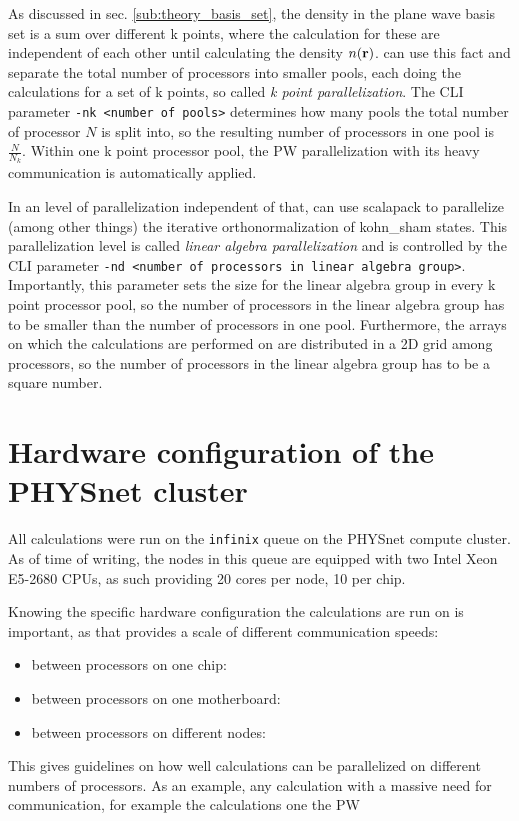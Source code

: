 \documentclass[main.tex]{subfiles}
\begin{document}
As discussed in sec. \ref{sub:theory_basis_set}, the density in the plane wave basis set is a sum over different k points, where the calculation for these are independent of each other until calculating the density \(n( \vb{r})\).
\QE can use this fact and separate the total number of processors into smaller pools, each doing the calculations for a set of k points, so called \emph{k point parallelization}.
The CLI parameter \texttt{-nk <number of pools>} determines how many pools the total number of processor \(N\) is split into, so the resulting number of processors in one pool is \(\frac{N}{N_k}\).
Within one k point processor pool, the PW parallelization with its heavy communication is automatically applied.

In an level of parallelization independent of that, \QE can use \gls{scalapack} to parallelize (among other things) the iterative orthonormalization of \acrshort{kohn_sham} states.
This parallelization level is called \emph{linear algebra parallelization} and is controlled by the CLI parameter \texttt{-nd <number of processors in linear algebra group>}.
Importantly, this parameter sets the size for the linear algebra group in every k point processor pool, so the number of processors in the linear algebra group has to be smaller than the number of processors in one pool.
Furthermore, the arrays on which the calculations are performed on are distributed in a 2D grid among processors, so the number of processors in the linear algebra group has to be a square number.


\section{Hardware configuration of the PHYSnet cluster}\label{sec:hardware_physnet}

All calculations were run on the \texttt{infinix} queue on the PHYSnet compute cluster. 
As of time of writing, the nodes in this queue are equipped with two Intel Xeon E5-2680 CPUs, as such providing 20 cores per node, 10 per chip.

Knowing the specific hardware configuration the calculations are run on is important, as that provides a scale of different communication speeds:
\begin{itemize}
    \item between processors on one chip:
    \item between processors on one motherboard:
    \item between processors on different nodes:
\end{itemize}
This gives guidelines on how well calculations can be parallelized on different numbers of processors.
As an example, any calculation with a massive need for communication, for example the calculations one the PW 
\end{document}
